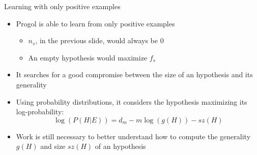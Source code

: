 \begin{frame}{Learning with only positive examples}

\begin{itemize}
    \item Progol is able to learn from only positive examples
    \begin{itemize}
        \item $n_s$, in the previous slide, would always be 0
        \item An empty hypothesis would maximize $f_s$
    \end{itemize}
    \item It searches for a good compromise between the size of an hypothesis and its generality
    \item Using probability distributions, it considers the hypothesis maximizing its log-probability:
    $$ \log(P(H|E)) = d_m - m \log(g(H)) - sz(H)$$
    \item Work is still necessary to better understand how to compute the generality $g(H)$ and size $sz(H)$ of an hypothesis
\end{itemize}
    
\end{frame}
% 

